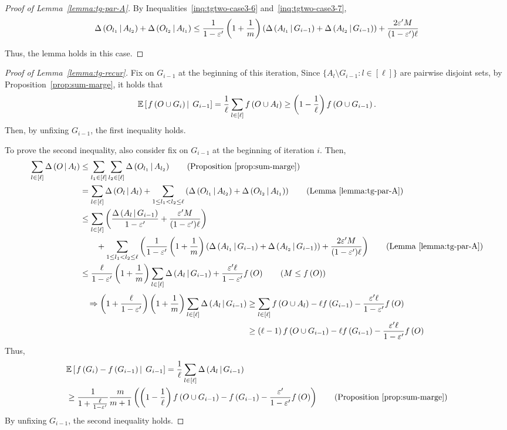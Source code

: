\begin{proof}[Proof of Lemma~\ref{lemma:tg-par-A}]
By Inequalities~\eqref{inq:tgtwo-case3-6} and~\eqref{inq:tgtwo-case3-7},
\begin{align*}
\Delta \left( O_{l_1} \, \middle| \, A_{l_2} \right)+\Delta \left( O_{l_2} \, \middle| \, A_{l_1} \right)
\le \frac{1}{1-\varepsilon'}\left(1+\frac{1}{m}\right)\left(\Delta \left( A_{l_1} \, \middle| \, G_{i-1} \right)+\Delta \left( A_{l_2} \, \middle| \, G_{i-1} \right)\right)
+\frac{2\varepsilon' M}{(1-\varepsilon')\ell}
\end{align*}

Thus, the lemma holds in this case.
\end{proof}

\begin{proof}[Proof of Lemma~\ref{lemma:tg-recur}]
Fix on $G_{i-1}$ at the beginning of this iteration,
Since $\{A_l\setminus G_{i-1}: l\in [\ell]\}$ are pairwise disjoint sets,
by Proposition~\ref{prop:sum-marge}, it holds that
\[\mathbb{E}\left[\left. f \left( O\cup G_i \right) \, \right| \; G_{i-1} \right] = \frac{1}{\ell}\sum_{l\in [\ell]}f \left( O\cup A_l \right) \ge \left(1-\frac{1}{\ell}\right)f \left( O\cup G_{i-1} \right).\]
Then, by unfixing $G_{i-1}$, the first inequality holds.

To prove the second inequality, also consider fix on $G_{i-1}$ at the beginning of iteration $i$.
Then,
\begin{align*}
\sum_{l\in [\ell]}\marge{O}{A_l} &\le \sum_{l_1\in [\ell]}\sum_{l_2\in [\ell]}\marge{O_{l_1}}{A_{l_2}}\tag{Proposition~\ref{prop:sum-marge}}\\
& = \sum_{l \in [\ell]}\marge{O_{l}}{A_{l}} + \sum_{1\le l_1< l_2 \le \ell} \left(\marge{O_{l_1}}{A_{l_2}} +\marge{O_{l_2}}{A_{l_1}}\right) \tag{Lemma~\ref{lemma:tg-par-A}}\\
& \le \sum_{l \in [\ell]}\left(\frac{\marge{A_{l}}{G_{i-1}}}{1-\epsi'}+\frac{\epsi' M}{(1-\epsi')\ell}\right)\\
&\hspace*{2em}+\sum_{1\le l_1< l_2 \le \ell} \left(\frac{1}{1-\epsi'}\left(1+\frac{1}{m}\right)\left(\marge{A_{l_1}}{G_{i-1}}
+\marge{A_{l_2}}{G_{i-1}}\right)
+\frac{2\epsi' M}{(1-\epsi')\ell}\right)\tag{Lemma~\ref{lemma:tg-par-A}}\\
&\le \frac{\ell}{1-\epsi'}\left(1+\frac{1}{m}\right)\sum_{l \in [\ell]}\marge{A_{l}}{G_{i-1}} + \frac{\epsi' \ell}{1-\epsi'}\ff{O}\tag{$M \le \ff{O}$}
\end{align*}
\begin{align*}
\Rightarrow \left(1+\frac{\ell}{1-\varepsilon'}\right)\left(1+\frac{1}{m}\right) \sum_{l\in [\ell]}\Delta \left( A_l \, \middle| \, G_{i-1} \right) &\ge \sum_{l\in [\ell]}f \left( O\cup A_l \right) -\ell f \left( G_{i-1} \right) - \frac{\varepsilon' \ell}{1-\varepsilon'}f \left( O \right)\\
&\ge \left(\ell-1\right)f \left( O\cup G_{i-1} \right)-\ell f \left( G_{i-1} \right) - \frac{\varepsilon' \ell}{1-\varepsilon'}f \left( O \right)
\end{align*}
Thus,
\begin{align*}
&\exc{\ff{G_i} - \ff{G_{i-1}}}{G_{i-1}}  = \frac{1}{\ell}\sum_{l \in [\ell]}\marge{A_{l}}{G_{i-1}}\\
&\ge \frac{1}{1+\frac{\ell}{1-\epsi'}} \frac{m}{m+1}\left(\left(1-\frac{1}{\ell}\right)  \ff{O\cup G_{i-1}} - \ff{G_{i-1}} - \frac{\epsi'}{1-\epsi'}\ff{O}\right)\tag{Proposition~\ref{prop:sum-marge}}
\end{align*}
By unfixing $G_{i-1}$, the second inequality holds.
\end{proof}

